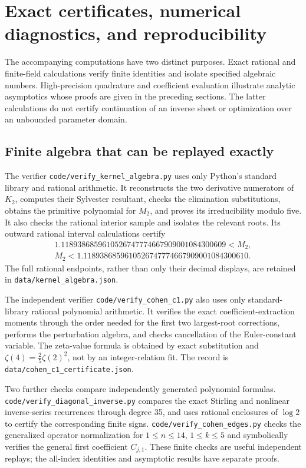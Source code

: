 \documentclass[11pt]{article}
\numberwithin{equation}{section}
\theoremstyle{definition}
\theoremstyle{remark}
\begin{document}
\section{Exact certificates, numerical diagnostics, and reproducibility}
\label{sec:computation}

The accompanying computations have two distinct purposes. Exact
rational and finite-field calculations verify finite identities and
isolate specified algebraic numbers. High-precision quadrature and
coefficient evaluation illustrate analytic asymptotics whose proofs
are given in the preceding sections. The latter calculations do not
certify continuation of an inverse sheet or optimization over an
unbounded parameter domain.

\subsection{Finite algebra that can be replayed exactly}

The verifier \nolinkurl{code/verify_kernel_algebra.py} uses only Python's
standard library and rational arithmetic. It reconstructs the two
derivative numerators of $K_2$, computes their Sylvester resultant,
checks the elimination substitutions, obtains the primitive polynomial
for $M_2$, and proves its irreducibility modulo five. It also checks
the rational interior sample and isolates the relevant roots. Its
outward rational interval calculations certify
\begin{gather*}
 1.1189386859610526747774667909001084300609
       <M_2,\\
 M_2<1.1189386859610526747774667909001084300610.
\end{gather*}
The full rational endpoints, rather than only their decimal displays,
are retained in \nolinkurl{data/kernel_algebra.json}.

The independent verifier \nolinkurl{code/verify_cohen_c1.py} also uses
only standard-library rational polynomial arithmetic. It verifies the
exact coefficient-extraction moments through the order needed for the
first two largest-root corrections, performs the perturbation algebra,
and checks cancellation of the Euler-constant variable. The zeta-value
formula is obtained by exact substitution and
$\zeta(4)=\tfrac25\zeta(2)^2$, not by an integer-relation fit.
The record is \nolinkurl{data/cohen_c1_certificate.json}.

Two further checks compare independently generated polynomial formulas.
\nolinkurl{code/verify_diagonal_inverse.py} compares the exact Stirling
and nonlinear inverse-series recurrences through degree 35, and uses
rational enclosures of $\log2$ to certify the corresponding finite
signs. \nolinkurl{code/verify_cohen_edges.py} checks the generalized
operator normalization for $1\leq n\leq14$, $1\leq k\leq5$ and
symbolically verifies the general first coefficient $C_{j,1}$.
These finite checks are useful independent replays; the all-index
identities and asymptotic results have separate proofs.
\end{document}
